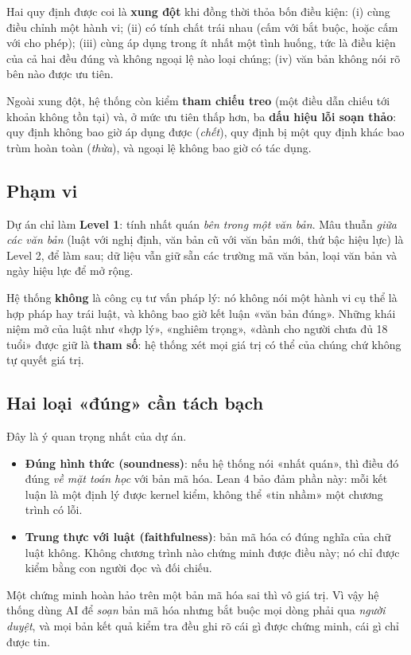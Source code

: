 \documentclass[12pt,a4paper]{article}
\newcommand{\term}[1]{\textbf{#1}}
\begin{document}
Hai quy định được coi là \term{xung đột} khi đồng thời thỏa bốn điều kiện: (i) cùng điều chỉnh một hành vi; (ii) có tính
chất trái nhau (cấm với bắt buộc, hoặc cấm với cho phép); (iii) cùng áp dụng trong ít nhất một tình huống, tức là điều kiện
của cả hai đều đúng và không ngoại lệ nào loại chúng; (iv) văn bản không nói rõ bên nào được ưu tiên.

Ngoài xung đột, hệ thống còn kiểm \term{tham chiếu treo} (một điều dẫn chiếu tới khoản không tồn tại) và, ở mức ưu tiên
thấp hơn, ba \term{dấu hiệu lỗi soạn thảo}: quy định không bao giờ áp dụng được (\emph{chết}), quy định bị một quy định khác
bao trùm hoàn toàn (\emph{thừa}), và ngoại lệ không bao giờ có tác dụng.

\subsection{Phạm vi}

Dự án chỉ làm \term{Level 1}: tính nhất quán \emph{bên trong một văn bản}. Mâu thuẫn \emph{giữa các văn bản} (luật với
nghị định, văn bản cũ với văn bản mới, thứ bậc hiệu lực) là Level 2, để làm sau; dữ liệu vẫn giữ sẵn các trường mã văn bản,
loại văn bản và ngày hiệu lực để mở rộng.

Hệ thống \textbf{không} là công cụ tư vấn pháp lý: nó không nói một hành vi cụ thể là hợp pháp hay trái luật, và không bao
giờ kết luận «văn bản đúng». Những khái niệm mở của luật như «hợp lý», «nghiêm trọng», «dành cho người chưa đủ 18 tuổi» được
giữ là \term{tham số}: hệ thống xét mọi giá trị có thể của chúng chứ không tự quyết giá trị.

\subsection{Hai loại «đúng» cần tách bạch}

Đây là ý quan trọng nhất của dự án.
\begin{itemize}
  \item \term{Đúng hình thức (soundness)}: nếu hệ thống nói «nhất quán», thì điều đó đúng \emph{về mặt toán học} với bản mã
    hóa. Lean 4 bảo đảm phần này: mỗi kết luận là một định lý được kernel kiểm, không thể «tin nhầm» một chương trình có lỗi.
  \item \term{Trung thực với luật (faithfulness)}: bản mã hóa có đúng nghĩa của chữ luật không. Không chương trình nào chứng
    minh được điều này; nó chỉ được kiểm bằng con người đọc và đối chiếu.
\end{itemize}
Một chứng minh hoàn hảo trên một bản mã hóa sai thì vô giá trị. Vì vậy hệ thống dùng AI để \emph{soạn} bản mã hóa nhưng
bắt buộc mọi dòng phải qua \emph{người duyệt}, và mọi bản kết quả kiểm tra đều ghi rõ cái gì được chứng minh, cái gì chỉ được tin.
\end{document}
